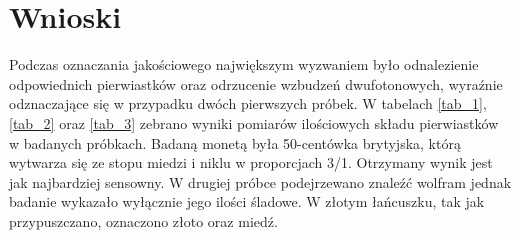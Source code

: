 \documentclass[11pt]{article}
\begin{document}
\section*{Wnioski}

Podczas oznaczania jakościowego największym wyzwaniem było odnalezienie odpowiednich pierwiastków oraz odrzucenie
wzbudzeń dwufotonowych, wyraźnie odznaczające się w przypadku dwóch pierwszych próbek.  
W tabelach \ref{tab_1}, \ref{tab_2} oraz \ref{tab_3} zebrano wyniki pomiarów ilościowych składu pierwiastków w badanych próbkach. 
Badaną monetą była 50-centówka brytyjska, którą wytwarza się ze stopu miedzi i niklu w proporcjach 3/1. Otrzymany wynik jest jak najbardziej sensowny.
W drugiej próbce podejrzewano znaleźć wolfram jednak badanie wykazało wyłącznie jego ilości śladowe.
W złotym łańcuszku, tak jak przypuszczano, oznaczono złoto oraz miedź. 
\end{document}
